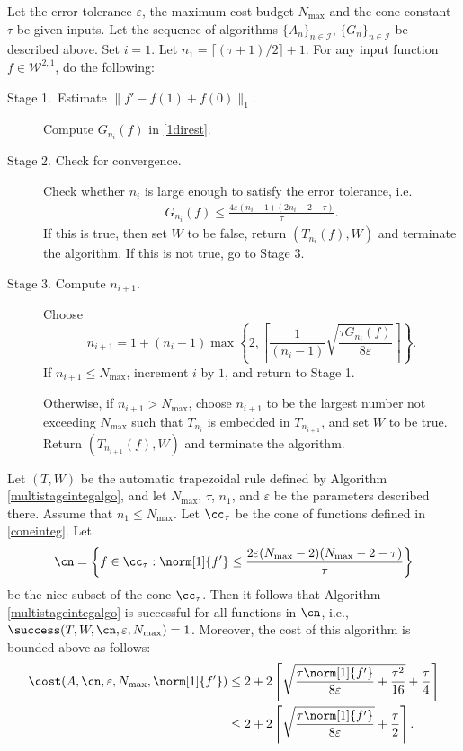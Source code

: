 \begin{algo} \label{multistageintegalgo}
Let the error tolerance $\varepsilon$, the maximum cost budget $N_{\text{max}}$ and the cone constant $\tau$ be given inputs. Let the sequence of algorithms $\{A_n\}_{n\in \mathcal{I}}$, $\{G_n\}_{n\in \mathcal{I}}$ be described above. Set $i=1$. Let $n_1=\lceil(\tau+1)/2\rceil+1$. For any input function $f\in \mathcal{W}^{2,1}$, do the following:
\begin{description}
\item[Stage 1.\ Estimate {$\|f'-f(1)+f(0)\|_{1}$}.] Compute $G_{n_i}(f)$ in \eqref{1direst}.

\item[Stage 2. Check for convergence.] Check whether $n_i$ is large enough to satisfy the error tolerance, i.e.
    \begin{align*}
     G_{n_i}(f) \le \frac{4\varepsilon(n_i-1)(2n_i-2 - \tau)}{\tau}.
    \end{align*}
    If this is true, then set $W$ to be false, return $(T_{n_i}(f),W)$ and terminate the algorithm. If this is not true, go to Stage 3.

\item[Stage 3. Compute $n_{i+1}$.] Choose
$$
n_{i+1}=1+ (n_i-1)\max\left\{2,\left\lceil\frac{1}{(n_i-1)}\sqrt{\frac{\tau G_{n_i}(f)}{8\varepsilon}}\right\rceil\right\}.
$$
If $n_{i+1} \le N_{\max}$, increment $i$ by $1$, and return to Stage 1.

Otherwise, if $n_{i+1} > N_{\max}$, choose $n_{i+1}$ to be the largest number not exceeding $N_{\max}$ such that $T_{n_{i}}$ is embedded in $T_{n_{i+1}}$, and set $W$ to be true. Return $(T_{n_{i+1}}(f),W)$ and terminate the algorithm.
\end{description}
\end{algo}

\begin{theorem} \label{multistageintegthm} Let $(T,W)$ be the automatic trapezoidal rule defined by Algorithm \ref{multistageintegalgo}, and let  $N_{\max}$, $\tau$, $n_1$, and $\varepsilon$ be the parameters described there.  Assume that $n_1 \le N_{\max}$.  Let $\cc_\tau$ be the cone of functions defined in \eqref{coneinteg}.  Let
$$
\cn
= \left \{ f \in \cc_\tau : \norm[1]{f'} \le \frac{2\varepsilon (N_{\max}-2)(N_{\max}-2 -\tau)}{\tau} \right\}
$$
be the nice subset of the cone $\cc_\tau$.  Then it follows that Algorithm \ref{multistageintegalgo} is successful for all functions in $\cn$,  i.e.,  $\success(T,W,\cn,\varepsilon,N_{\max}) = 1$.  Moreover, the cost of this algorithm is bounded above as follows:
\begin{align*}
\cost(A,\cn,\varepsilon,N_{\max},\norm[1]{f'})
&\le 2+2 \left \lceil \sqrt{\frac{\tau \norm[1]{f'}}{8\varepsilon} + \frac{\tau^2 }{16}} + \frac{\tau}{4} \right\rceil \\
&\le 2+2 \left \lceil\sqrt{\frac{\tau \norm[1]{f'}}{8\varepsilon}} + \frac{\tau}{2} \right \rceil.
\end{align*}
\end{theorem}



